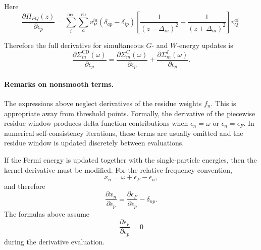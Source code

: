 Here
\begin{equation}
    \frac{\partial \Pi_{PQ}(z)}
    {\partial \epsilon_p}
    =
    \sum_i^{\mathrm{occ}}
    \sum_a^{\mathrm{vir}}
    v_P^{ia}
    \left(\delta_{ap}-\delta_{ip}\right)
    \left[
    \frac{1}{(z-\Delta_{ia})^2}
    +
    \frac{1}{(z+\Delta_{ia})^2}
    \right]
    v_Q^{ai}.
\end{equation}

Therefore the full derivative for simultaneous \(G\)- and \(W\)-energy updates is
\begin{equation}
    \boxed{
    \frac{\partial \Sigma_m^{\mathrm{CD}}(\omega)}
    {\partial \epsilon_p}
    =
    \frac{\partial \Sigma_m^C(\omega)}
    {\partial \epsilon_p}
    +
    \frac{\partial \Sigma_m^I(\omega)}
    {\partial \epsilon_p}
    }.
\end{equation}

\paragraph{Remarks on nonsmooth terms.}

The expressions above neglect derivatives of the residue weights \(f_n\).  This
is appropriate away from threshold points.  Formally, the derivative of the
piecewise residue window produces delta-function contributions when
\(\epsilon_n=\omega\) or \(\epsilon_n=\epsilon_F\).  In numerical
self-consistency iterations, these terms are usually omitted and the residue
window is updated discretely between evaluations.

If the Fermi energy is updated together with the single-particle energies, then
the kernel derivative must be modified.  For the relative-frequency convention,
\begin{equation}
    x_n=\omega+\epsilon_F-\epsilon_n,
\end{equation}
and therefore
\begin{equation}
    \frac{\partial x_n}{\partial \epsilon_p}
    =
    \frac{\partial \epsilon_F}{\partial \epsilon_p}
    -
    \delta_{np}.
\end{equation}
The formulas above assume
\begin{equation}
    \frac{\partial \epsilon_F}{\partial \epsilon_p}=0
\end{equation}
during the derivative evaluation.
